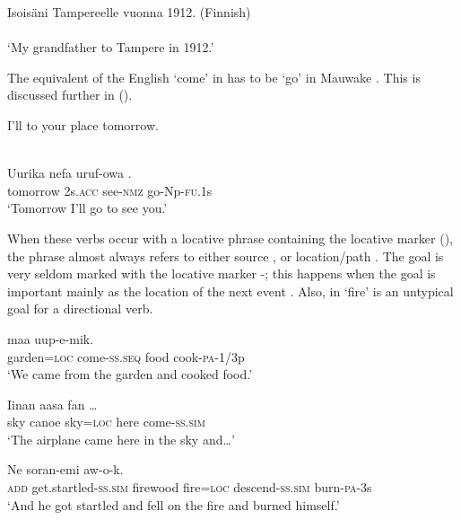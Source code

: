 \ea%
\label{ex:3:x282}
\gll Isois\"ani  Tampereelle vuonna 1912. (Finnish)\\ \\
\glt`My grandfather  to Tampere in 1912.' 
\z

The equivalent of the English `come' in  has to be `go' in Mauwake . This is discussed further in (). 

\ea%
\label{ex:3:x283}
\gll I'll  to your place tomorrow. \\
\\
\z

\ea%
\label{ex:3:x284}
\gll Uurika nefa uruf-owa . \\
tomorrow 2s.\textsc{acc} see-\textsc{nmz} go-Np-\textsc{fu}.1s \\
\glt`Tomorrow I'll go to see you.'
\z

When these verbs occur with a locative phrase containing the locative marker (), the phrase almost always refers to either source , or location/path . The goal is very seldom marked with the locative marker -; this happens when the goal is important mainly as the location of the next event . Also, in   `fire' is an untypical goal for a directional verb.

\ea%
\label{ex:3:x285}
\gll {}  maa uup-e-mik. \\
garden=\textsc{loc} come-\textsc{ss}.\textsc{seq} food cook-\textsc{pa}-1/3p \\
\glt`We came from the garden and cooked food.'
\z

\ea%
\label{ex:3:x447}
\gll Iinan aasa  fan  {\dots} \\
sky canoe sky=\textsc{loc} here come-\textsc{ss}.\textsc{sim}\\
\glt`The airplane came here in the sky and{\dots}'
\z

\ea%
\label{ex:3:x1878}
\gll Ne soran-emi  \textstyleEmphasizedVernacularWords{=} \textstyleEmphasizedVernacularWords{-} aw-o-k.
\\
\textsc{add} get.startled-\textsc{ss}.\textsc{sim} firewood fire=\textsc{loc} descend-\textsc{ss}.\textsc{sim} burn-\textsc{pa}-3s\\
\glt`And he got startled and fell on the fire and burned himself.'
\z

